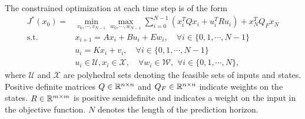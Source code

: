 The constrained optimization at each time step is of the form
\begin{align}
\label{eq:RMPC_prob}
J^{\ast}(x_0)=&\min_{v_0,\cdots,v_{N-1}} \max_{w_0,\cdots,w_{N-1}} \sum_{i=0}^{N-1}(x_i^TQx_i+u_i^TRu_i) + x_N^TQ_Fx_N\nonumber\\
\text{s.t.} \quad &x_{i+1}=Ax_i+Bu_i + E w_i, \quad\forall i\in\{0,1,\cdots,N-1\}\nonumber\\
\quad &u_i=Kx_i+v_i, \quad\forall i\in\{0,1,\cdots,N-1\}\nonumber\\
&u_i\in\mathcal{U},x_i\in\mathcal{X},\quad \forall w_i\in\mathcal{W},\,\,\forall i\in\{0,1,\cdots,N\},
\end{align}
%
where $\mathcal U$ and $\mathcal X$ are polyhedral sets denoting the feasible
sets of inputs and states. Positive definite matrices $Q\in\mathbb{R}^{n\times n}$ and
$Q_F\in\mathbb{R}^{n\times n}$ indicate weights on the states. $R\in\mathbb{R}^{m\times m}$ is
positive semidefinite and indicates a weight on the input in the objective function. $N$ denotes the length of the prediction horizon.

